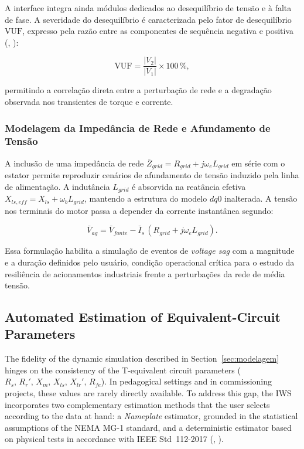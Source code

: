 A interface integra ainda módulos dedicados ao desequilíbrio de tensão e à falta de fase. A severidade do desequilíbrio é caracterizada pelo fator de desequilíbrio $\text{VUF}$, expresso pela razão entre as componentes de sequência negativa e positiva (\citeauthor{karakas2009aggregation}, \citeyear{karakas2009aggregation}):

\begin{equation}
\label{eq:vuf}
\text{VUF} = \frac{|V_2|}{|V_1|} \times 100\,\%,
\end{equation}

\noindent permitindo a correlação direta entre a perturbação de rede e a degradação observada nos transientes de torque e corrente.

\subsubsection{Modelagem da Impedância de Rede e Afundamento de Tensão}

A inclusão de uma impedância de rede $\bar{Z}_{grid} = R_{grid} + j\omega_e L_{grid}$ em série com o estator permite reproduzir cenários de afundamento de tensão induzido pela linha de alimentação. A indutância $L_{grid}$ é absorvida na reatância efetiva $X_{ls,eff} = X_{ls} + \omega_b L_{grid}$, mantendo a estrutura do modelo $dq0$ inalterada. A tensão nos terminais do motor passa a depender da corrente instantânea segundo:

\begin{equation}
\label{eq:vag_grid}
\bar{V}_{ag} = \bar{V}_{fonte} - \bar{I}_s\,(R_{grid} + j\omega_e L_{grid}).
\end{equation}

\noindent Essa formulação habilita a simulação de eventos de \textit{voltage sag} com a magnitude e a duração definidos pelo usuário, condição operacional crítica para o estudo da resiliência de acionamentos industriais frente a perturbações da rede de média tensão.


\subsection{Automated Estimation of Equivalent-Circuit Parameters}
\label{subsec:estimation_en}

The fidelity of the dynamic simulation described in Section~\ref{sec:modelagem} hinges on the consistency of the T-equivalent circuit parameters ($R_s,\,R_r',\,X_m,\,X_{ls},\,X_{lr}',\,R_{fe}$). In pedagogical settings and in commissioning projects, these values are rarely directly available. To address this gap, the IWS incorporates two complementary estimation methods that the user selects according to the data at hand: a \textit{Nameplate} estimator, grounded in the statistical assumptions of the NEMA MG-1 standard, and a deterministic estimator based on physical tests in accordance with IEEE Std~112-2017 (\citeauthor{ieee112_2017}, \citeyear{ieee112_2017}).

